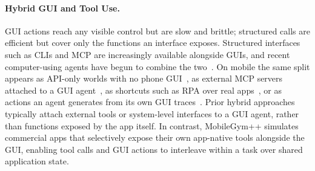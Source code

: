 \paragraph{Hybrid GUI and Tool Use.} 

GUI actions reach any visible control but are slow and brittle; structured calls are efficient but cover only the functions an interface exposes.
Structured interfaces such as CLIs and MCP are increasingly available alongside GUIs, and recent computer-using agents have begun to combine the two~\citep{sun2026scienceboard, hu2026toolcua, yan2025mcpworld, jia2026osworld, fan2026screenshots}.
On mobile the same split appears as API-only worlds with no phone GUI~\citep{trivedi2024appworld}, as external MCP servers attached to a GUI agent~\citep{kong2026mobileworld}, as shortcuts such as RPA over real apps~\citep{zhao2026mas}, or as actions an agent generates from its own GUI traces~\citep{lee2026improving}.
Prior hybrid approaches typically attach external tools or system-level interfaces to a GUI agent, rather than functions exposed by the app itself. In contrast, MobileGym++ simulates commercial apps that selectively expose their own app-native tools alongside the GUI, enabling tool calls and GUI actions to interleave within a task over shared application state.
